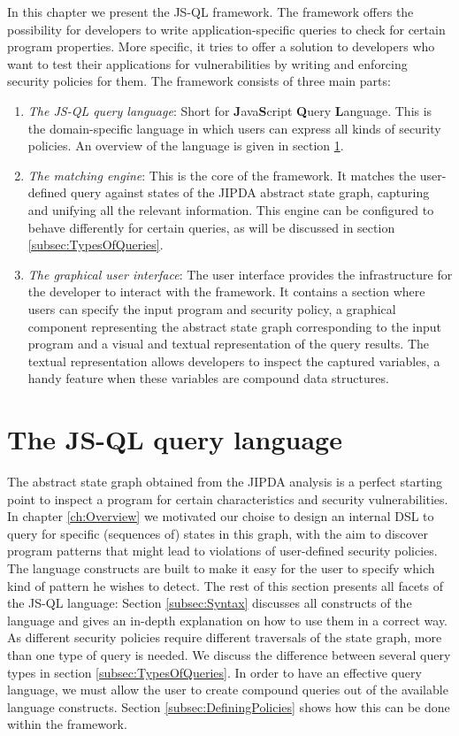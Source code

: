 In this chapter we present the JS-QL framework. The framework offers the possibility for developers to write application-specific queries to check for certain program properties. More specific, it tries to offer a solution to developers who want to test their applications for vulnerabilities by writing and enforcing security policies for them. The framework consists of three main parts: 
\begin{enumerate}
\item \textit{The JS-QL query language}: Short for \textbf{J}ava\textbf{S}cript \textbf{Q}uery \textbf{L}anguage. This is the domain-specific language in which users can express all kinds of security policies. An overview of the language is given in section \ref{sec:JSQLlanguage}.
\item \textit{The matching engine}: This is the core of the framework. It matches the user-defined query against states of the JIPDA abstract state graph, capturing and unifying all the relevant information. This engine can be configured to behave differently for certain queries, as will be discussed in section \ref{subsec:TypesOfQueries}.
\item \textit{The graphical user interface}: The user interface provides the infrastructure for the developer to interact with the framework. It contains a section where users can specify the input program and security policy, a graphical component representing the abstract state graph corresponding to the input program and a visual and textual representation of the query results. The textual representation allows developers to inspect the captured variables, a handy feature when these variables are compound data structures.
\end{enumerate}

\section{The JS-QL query language}
\label{sec:JSQLlanguage}

The abstract state graph obtained from the JIPDA analysis is a perfect starting point to inspect a program for certain characteristics and security vulnerabilities. In chapter \ref{ch:Overview} we motivated our choise to design an internal DSL to query for specific (sequences of) states in this graph, with the aim to discover program patterns that might lead to violations of user-defined security policies. The language constructs are built to make it easy for the user to specify which kind of pattern he wishes to detect. The rest of this section presents all facets of the JS-QL language: Section \ref{subsec:Syntax} discusses all constructs of the language and gives an in-depth explanation on how to use them in a correct way. As different security policies require different traversals of the state graph, more than one type of query is needed. We discuss the difference between several query types in section \ref{subsec:TypesOfQueries}. In order to have an effective query language, we must allow the user to create compound queries out of the available language constructs. Section \ref{subsec:DefiningPolicies} shows how this can be done within the framework.

